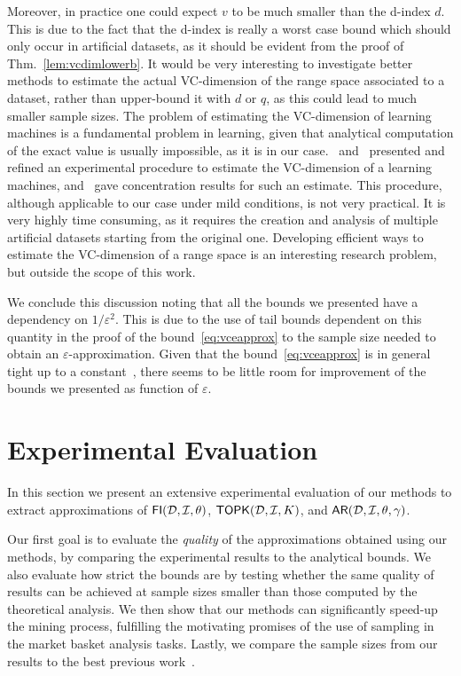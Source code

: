 Moreover, in practice one could expect $v$ to be much smaller than the d-index
$d$. This is due to the fact that the d-index is really a worst case bound which
should only occur in artificial datasets, as it should be evident from the
proof of Thm.~\ref{lem:vcdimlowerb}. It would be very interesting to investigate
better methods to estimate the actual VC-dimension of the range space associated
to a dataset, rather than upper-bound it with $d$ or $q$, as this could lead to
much smaller sample sizes. The problem of estimating the VC-dimension of
learning machines is a fundamental problem in learning, given that analytical
computation of the exact value is usually impossible, as it is in our
case. \citet{VapnikLLC94}~and~\citet{ShaoCL00} presented and refined an
experimental procedure to estimate the VC-dimension of a learning machines,
and~\citet{McDonaldSS11} gave concentration results for such an estimate. This
procedure, although applicable to our case under mild conditions, is not very
practical. It is very highly time consuming, as it requires the creation and
analysis of multiple artificial datasets starting from the original one.
Developing efficient ways to estimate the VC-dimension of a range space is
an interesting research problem, but outside the scope of this work.

We conclude this discussion noting that all the bounds we presented have a
dependency on $1/\varepsilon^2$. This is due to the use of tail bounds dependent
on this quantity in the proof of the bound~\eqref{eq:vceapprox} to the sample size
needed to obtain an $\varepsilon$-approximation. Given that the
bound~\eqref{eq:vceapprox} is in general tight up to a constant~\cite{LiLS01},
there seems to be little room for improvement of the bounds we presented as
function of $\varepsilon$.

\section{Experimental Evaluation}\label{sec:vcmineexp}
In this section we present an extensive experimental evaluation of
our methods to extract approximations of $\mathsf{FI}({\cal D},{\cal I},\theta)$, $\mathsf{TOPK}({\cal D},{\cal I},K)$, and
$\mathsf{AR}({\cal D},{\cal I},\theta,\gamma)$.

Our first goal is to evaluate the \emph{quality} of the
approximations obtained using our methods, by comparing the experimental results 
to the analytical bounds. We also evaluate how strict the bounds are
 by testing whether the same quality of results can be
achieved at sample sizes smaller than those computed by the theoretical analysis. 
We then show that our methods can significantly speed-up the mining process,
fulfilling the motivating promises of the use of sampling in the market basket
analysis tasks. Lastly, we compare the sample sizes from our results to the best
previous work~\cite{ChakaravarthyPS09}.

